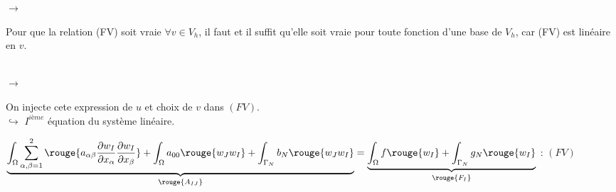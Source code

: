 \documentclass[12pt,a4paper]{article}
\begin{document}
\begin{sol}
\begin{enumerate}
\begin{minipage}[t]{15cm}
				\vspace{.5cm}
				
				$\to$ \begin{minipage}[t]{15cm}
					Pour que la relation (FV) soit vraie $\forall v \in V_h$, il faut et il suffit qu'elle soit vraie pour toute fonction d'une base de $V_h$, car (FV) est linéaire en $v$.\\
				\end{minipage}\\
				
				$\to$ \begin{minipage}[t]{18cm}
					On injecte cete expression de $u$ et choix de $v$ dans $(FV)$.\\
					$\hookrightarrow$ $I^{ième}$ équation du système linéaire.
				\end{minipage}
			\end{minipage}
			
			\newpage
			
			\begin{minipage}[t]{18.5cm}
				$\underbrace{\displaystyle\int_\Omega \sum_{\alpha,\beta=1}^2 \rouge{a_{\alpha\beta}\dfrac{\partial w_I}{\partial x_\alpha}\dfrac{\partial w_I}{\partial x_\beta}} + \int_\Omega a_{00} \rouge{w_Jw_I} + \int_{\Gamma_N} b_N \rouge{w_J w_I}}_{\rouge{A_{IJ}}} = \underbrace{\int_\Omega f \rouge{w_I} + \int_{\Gamma_N} g_N\rouge{w_I}}_{\rouge{F_I}}$ : $(FV)$\\
				

\end{minipage}
\end{enumerate}
\end{sol}
\end{document}
